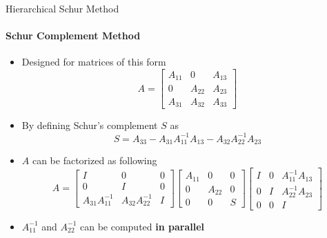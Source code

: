 \documentclass[final]{beamer}
\newlength{\onecolwid}
\begin{document}
\begin{frame}[t]
\begin{columns}[t]
      \begin{column}{\onecolwid}
        \begin{block}{Hierarchical Schur Method}
          \paragraph{\textbf{Schur Complement Method}}
          \begin{itemize}
            \item Designed for matrices of this form
              \begin{equation*}
                A = \left[
                \begin{array}{ccc}
                  A_{11} &      0 & A_{13} \\
                       0 & A_{22} & A_{23} \\
                  A_{31} & A_{32} & A_{33}
                \end{array}
                \right]
              \end{equation*}
            \item By defining Schur’s complement $S$ as
              \begin{equation*}
                S = A_{33} - A_{31}A^{-1}_{11}A_{13} - A_{32}A^{-1}_{22}A_{23}
              \end{equation*}
            \item $A$ can be factorized as following
              $$
                A=
                \left[
                \begin{array}{ccc}
                                  I &                 0 & 0 \\
                                  0 &                 I & 0 \\
                  A_{31}A^{-1}_{11} & A_{32}A^{-1}_{22} & I
                \end{array}
                \right]
                \left[
                  \begin{array}{ccc}
                    A_{11} &      0 & 0 \\
                         0 & A_{22} & 0 \\
                         0 &      0 & S
                  \end{array}
                \right]
                \left[
                \begin{array}{ccc}
                  I & 0 & A^{-1}_{11}A_{13} \\
                  0 & I & A^{-1}_{22}A_{23} \\
                  0 & 0 &                 I
                \end{array}
                \right]
              $$
            \item $A^{-1}_{11}$ and $A^{-1}_{22}$ can be computed \textbf{in parallel}
          \end{itemize}


\end{block}
\end{column}
\end{columns}
\end{frame}
\end{document}
